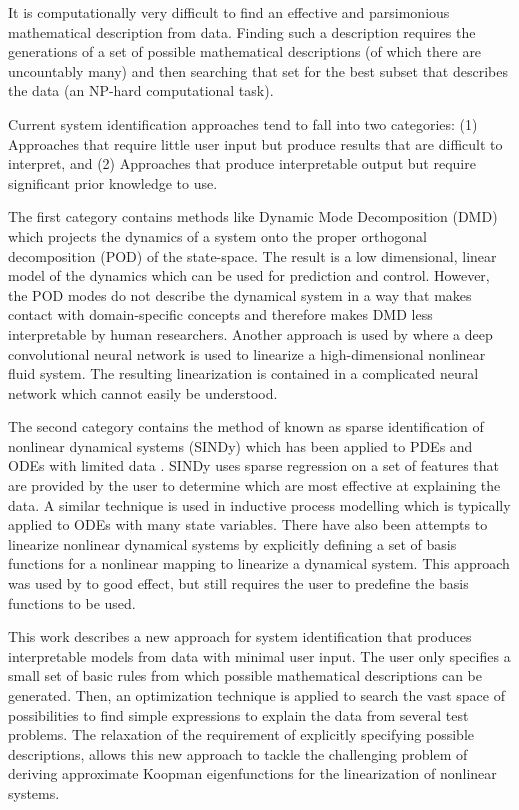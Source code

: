\documentclass{article}
\begin{document}
It is computationally very difficult to find an effective and parsimonious mathematical description from data. Finding such a description requires the generations of a set of possible mathematical descriptions (of which there are uncountably many) and then searching that set for the best subset that describes the data (an NP-hard computational task).
 
 Current system identification approaches tend to fall into two categories: (1) Approaches that require little user input but produce results that are difficult to interpret, and (2) Approaches that produce interpretable output but require significant prior knowledge to use.

The first category contains methods like Dynamic Mode Decomposition (DMD) \cite{schmid2010dynamic, kutz2016dynamic} which projects the dynamics of a system onto the proper orthogonal decomposition (POD) of the state-space. The result is a low dimensional, linear model of the dynamics which can be used for prediction and control. However, the POD modes do not describe the dynamical system in a way that makes contact with domain-specific concepts and therefore makes DMD less interpretable by human researchers. Another approach is used by \cite{morton2018deep} where a deep convolutional neural network is used to linearize a high-dimensional nonlinear fluid system. The resulting linearization is contained in a complicated neural network which cannot easily be understood.

The second category contains the method of \cite{brunton2016discovering} known as sparse identification of nonlinear dynamical systems (SINDy) which has been applied to PDEs \cite{rudy2017data} and ODEs with limited data \cite{kaiser2018sparse}. SINDy uses sparse regression on a set of features that are provided by the user to determine which are most effective at explaining the data. A similar technique is used in inductive process modelling \cite{bridewell2008inductive, langley2006constructing} which is typically applied to ODEs with many state variables. There have also been attempts to linearize nonlinear dynamical systems by explicitly defining a set of basis functions for a nonlinear mapping to linearize a dynamical system. This approach was used by \cite{williams2015data, johnson2018class} to good effect, but still requires the user to predefine the basis functions to be used. 

This work describes a new approach for system identification that produces interpretable models from data with minimal user input. The user only specifies a small set of basic rules from which possible mathematical descriptions can be generated. Then, an optimization technique is applied to search the vast space of possibilities to find simple expressions to explain the data from several test problems. The relaxation of the requirement of explicitly specifying possible descriptions, allows this new approach to tackle the challenging problem of deriving approximate Koopman eigenfunctions for the linearization of nonlinear systems.
\end{document}
